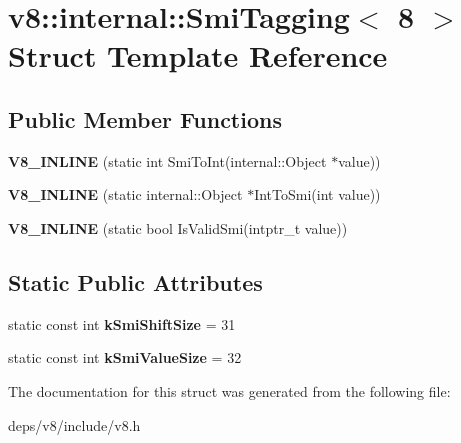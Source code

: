\hypertarget{structv8_1_1internal_1_1_smi_tagging_3_018_01_4}{}\section{v8\+:\+:internal\+:\+:Smi\+Tagging$<$ 8 $>$ Struct Template Reference}
\label{structv8_1_1internal_1_1_smi_tagging_3_018_01_4}
\subsection*{Public Member Functions}
\begin{DoxyCompactItemize}
\item 
\hypertarget{structv8_1_1internal_1_1_smi_tagging_3_018_01_4_a437400284d4bceba15aebeaa2fb81c70}{}{\bfseries V8\+\_\+\+I\+N\+L\+I\+N\+E} (static int Smi\+To\+Int(internal\+::\+Object $\ast$value))\label{structv8_1_1internal_1_1_smi_tagging_3_018_01_4_a437400284d4bceba15aebeaa2fb81c70}

\item 
\hypertarget{structv8_1_1internal_1_1_smi_tagging_3_018_01_4_a5c5c17f2b19b3ff53f3c68359fa19ea6}{}{\bfseries V8\+\_\+\+I\+N\+L\+I\+N\+E} (static internal\+::\+Object $\ast$Int\+To\+Smi(int value))\label{structv8_1_1internal_1_1_smi_tagging_3_018_01_4_a5c5c17f2b19b3ff53f3c68359fa19ea6}

\item 
\hypertarget{structv8_1_1internal_1_1_smi_tagging_3_018_01_4_ad9569bfb3b46bcfcb4b0ea1fd0a712ea}{}{\bfseries V8\+\_\+\+I\+N\+L\+I\+N\+E} (static bool Is\+Valid\+Smi(intptr\+\_\+t value))\label{structv8_1_1internal_1_1_smi_tagging_3_018_01_4_ad9569bfb3b46bcfcb4b0ea1fd0a712ea}

\end{DoxyCompactItemize}
\subsection*{Static Public Attributes}
\begin{DoxyCompactItemize}
\item 
\hypertarget{structv8_1_1internal_1_1_smi_tagging_3_018_01_4_a9a3b3da7b6d82417b961c8bed4366407}{}static const int {\bfseries k\+Smi\+Shift\+Size} = 31\label{structv8_1_1internal_1_1_smi_tagging_3_018_01_4_a9a3b3da7b6d82417b961c8bed4366407}

\item 
\hypertarget{structv8_1_1internal_1_1_smi_tagging_3_018_01_4_a08ad86fa77f6faee6ec744abdb0f6dce}{}static const int {\bfseries k\+Smi\+Value\+Size} = 32\label{structv8_1_1internal_1_1_smi_tagging_3_018_01_4_a08ad86fa77f6faee6ec744abdb0f6dce}

\end{DoxyCompactItemize}


The documentation for this struct was generated from the following file\+:\begin{DoxyCompactItemize}
\item 
deps/v8/include/v8.\+h\end{DoxyCompactItemize}
